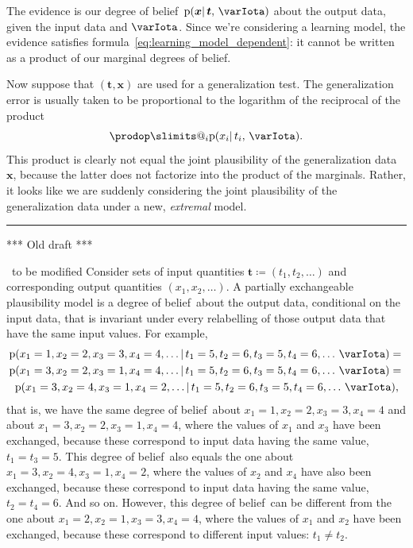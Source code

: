 \documentclass[\ifafour a4paper,12pt,\else a5paper,10pt,\fi%
onecolumn,oneside,article,%
british%
]{memoir}
\makeatletter
\theoremstyle{remark}
\theoremstyle{innote}
\def\prod{\DOTSI\prodop\slimits@}
\newcommand*{\defd}{\coloneqq}
\newcommand*{\pf}{\mathrm{p}}%
\renewcommand*{\|}{\mathpunct{|}}
\newcommand*{\puzzle}{\maltese}
\newcommand{\mynote}[1]{ {\color{notecolour}\puzzle\ #1}}
\newcommand*{\dob}{degree of belief}
\newcommand*{\dobs}{degrees of belief}
\newcommand*{\yI}{\varIota}
\newcommand*{\yt}{\bm{t}}
\newcommand*{\yx}{\bm{x}}
\makeatother
\begin{document}
The evidence is our \dob\ $\pf(\yx \| \yt,\, \yI)$ about the output data,
given the input data and $\yI$. Since we're considering a learning model,
the evidence satisfies formula~\eqref{eq:learning_model_dependent}: it
cannot be written as a product of our marginal \dobs.

Now suppose that $(\yt, \yx)$ are used for a generalization test. The
generalization error is usually taken to be proportional to the logarithm
of the reciprocal of the product
\begin{equation}
  \label{eq:generror_def}
  \prod_i   \pf(x_i \| t_i,\, \yI).
\end{equation}
This product is clearly not equal the joint plausibility of the
generalization data $\yx$, because the latter does not factorize into the
product of the marginals. Rather, it looks like we are suddenly considering
the joint plausibility of the generalization data under a new,
\emph{extremal} model.





\clearpage
\hrule

*** Old draft ***






\mynote{to be modified}
Consider sets of input quantities $\yt\defd(t_1, t_2, \dotsc)$ and
corresponding output quantities $(x_1, x_2, \dotsc)$.
A partially exchangeable plausibility model is a \dob\ about the output
data, conditional on the input data, that is invariant under every relabelling of
those output data that have the same input values. For example, 
\begin{multline}
  \label{eq:example_partial_exch}
  \pf(x_1=1,x_2=2,x_3=3,x_4=4, \dotsc \|
  t_1=5,t_2=6,t_3=5,t_4=6, \dotsc \, \yI)
  ={}\\
  \pf(x_1=3,x_2=2,x_3=1,x_4=4, \dotsc \|
  t_1=5,t_2=6,t_3=5,t_4=6,\dotsc \, \yI)
  ={}\\
  \pf(x_1=3,x_2=4,x_3=1,x_4=2, \dotsc \|
  t_1=5,t_2=6,t_3=5,t_4=6,\dotsc \, \yI),
\end{multline}
that is, we have the same \dob\ about $x_1=1,x_2=2,x_3=3,x_4=4$ and about
$x_1=3,x_2=2,x_3=1,x_4=4$, where the values of $x_1$ and $x_3$ have been
exchanged, because these correspond to input data having the same value,
$t_1=t_3=5$. This \dob\ also equals the one about
$x_1=3,x_2=4,x_3=1,x_4=2$, where the values of $x_2$ and $x_4$ have also
been exchanged, because these correspond to input data having the same
value, $t_2=t_4=6$. And so on. However, this \dob\ can be different from
the one about $x_1=2,x_2=1,x_3=3,x_4=4$, where the values of $x_1$ and
$x_2$ have been exchanged, because these correspond to different input
values: $t_1 \ne t_2$.
\end{document}
